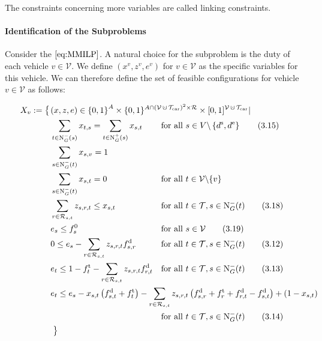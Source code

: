 The constraints concerning more variables are called linking constraints.

\paragraph{Identification of the Subproblems} \parfill

Consider the $\eqref{eq:MMILP}$. A natural choice for the subproblem is the duty of each vehicle $v\in\mathcal{V}$. We define $\left(x^v,z^v,e^v\right)$ for $v\in\mathcal{V}$ as the specific variables for this vehicle. We can therefore define the set of feasible configurations for vehicle $v\in\mathcal{V}$ as follows:

\begin{align}
	X_v := \left\{\vphantom{\{0,1\}^A}\right. & \omit\rlap{$\displaystyle{(x,z,e)\in\left\{0,1\right\}^A \times\{0,1\}^{A\cap\left(\mathcal{V}\cupdot\Tcar\right)^2\times\mathcal{R}} \times[0,1]^{\mathcal{V}\cupdot\Tcar}|}$} \nonumber \\
	& \sum_{t\in\Nin(s)} x_{t,s} = \sum_{t\in\Nout(s)} x_{s,t} && \text{for all } s\in V\backslash\left\{d^{\operatorname{s}},d^{\operatorname{e}}\right\} \tag{3.15} \\
	& \sum_{s\in\Nin(t)} x_{s,v} = 1 \label{eq:Xv:vehicle} \\
	& \sum_{s\in\Nin(t)} x_{s,t} = 0 && \text{for all } t\in\mathcal{V}\backslash\{v\} \label{eq:Xv:other_vehicles} \\
	& \sum_{r\in\Rst} z_{s,r,t} \leq x_{s,t} & & \text{for all } t\in\mathcal{T}, s\in\Nin(t) \tag{3.18} \\
	& e_s \leq f_s^0 & & \text{for all } s\in\mathcal{V} \tag{3.19} \\
	& 0 \leq e_s - \sum_{r\in\Rst} z_{s,r,t}\fd_{s,r} & & \text{for all } t\in\mathcal{T}, s\in\Nin(t) \tag{3.12} \\
	& e_t \leq 1 - \ft_t - \sum_{r\in\Rst} z_{s,r,t}\fd_{r,t} & & \text{for all } t\in\mathcal{T}, s\in\Nin(t) \tag{3.13} \\
	& \omit\rlap{$\displaystyle{e_t \leq e_s - x_{s,t}\left(f_{s,t}^{\operatorname{d}}+f_t^{\operatorname{t}}\right) - \sum_{r\in\Rst} z_{s,r,t}\left(\fd_{s,r}+\ft_r+\fd_{r,t}-\fd_{s,t}\right) + \left(1-x_{s,t}\right)}$} \nonumber \\
	& & & \text{for all } t\in\mathcal{T}, s\in\Nin(t) \tag{3.14} \\
	& \left. \vphantom{\{0,1\}^A} \right\} \nonumber
\end{align}

